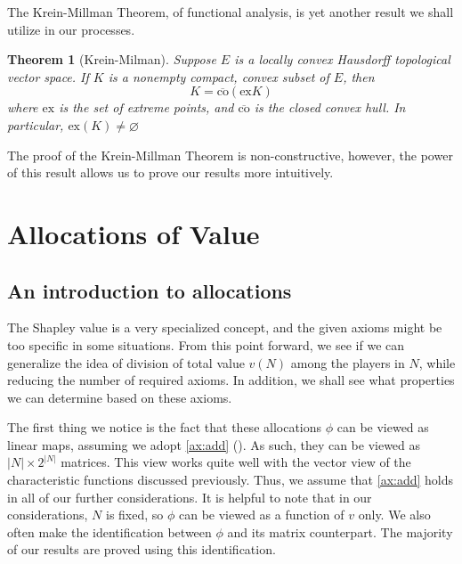\documentclass[12pt,letterpaper,final]{article}
\theoremstyle{plain}
\newtheorem{theorem}{Theorem}[section]
\theoremstyle{plain}
\theoremstyle{plain}
\theoremstyle{plain}
\theoremstyle{plain}
\theoremstyle{plain}
\theoremstyle{plain}
\theoremstyle{definition}
\theoremstyle{definition}
\theoremstyle{definition}
\theoremstyle{definition}
\theoremstyle{definition}
\theoremstyle{remark}
\theoremstyle{remark}
\theoremstyle{remark}
\theoremstyle{remark}
\begin{document}
The Krein-Millman Theorem, of functional analysis, is yet another
result we shall utilize in our processes.

\begin{theorem}[Krein-Milman]\label{thm:krein-Millman}
  Suppose \(E\) is a locally convex Hausdorff topological vector space.
  If \(K\) is a nonempty compact, convex subset of \(E\), then
  \[
    K = \overline{\text{co}}\left(\text{ex}K\right)
  \]
  where \(\text{ex}\) is the set of extreme points, and
  \(\overline{\text{co}}\) is the closed convex hull.
  In particular, \(\text{ex}(K)\neq \varnothing\) 
\end{theorem}

The proof of the Krein-Millman Theorem is non-constructive,
however, the power of this result allows us to prove our results more
intuitively.




















\section{Allocations of Value}
\label{cha:allocations-value}

\subsection{An introduction to allocations}

The Shapley value is a very specialized concept, and the given axioms
might be too specific in some situations. From this point forward, we
see if we can
generalize the idea of division of total value \(v(N)\) among the
players in \(N\), while reducing the number
of required axioms. In addition, we shall see what properties we can
determine based on these axioms.

The first thing we notice is the fact that these
allocations \(\phi\) can be viewed as linear maps, assuming we adopt
\cref{ax:add} (). As such, they can be viewed 
as \(|N| \times 2^{|N|}\) matrices. This view works quite well with
the vector view of the characteristic functions discussed
previously. Thus, we assume that \cref{ax:add} holds in all of our
further 
considerations. It is helpful to note that in our considerations,
\(N\) is fixed, so \(\phi\) can be viewed as a function of \(v\)
only. We also often make the identification between \(\phi\) and
its matrix counterpart. The majority of our results are proved using
this identification.
\end{document}
